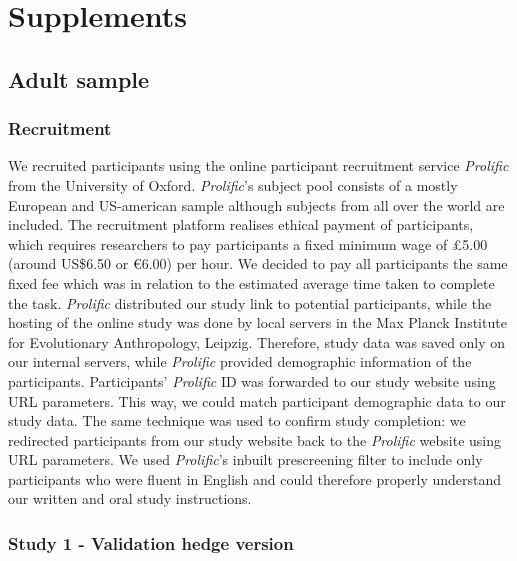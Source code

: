 \documentclass[
  man,floatsintext]{apa6}
\begin{document}
\endgroup

\newpage

\hypertarget{supplements}{%
\section{Supplements}\label{supplements}}

\hypertarget{adult-sample}{%
\subsection{Adult sample}\label{adult-sample}}

\hypertarget{recruitment}{%
\subsubsection{Recruitment}\label{recruitment}}

We recruited participants using the online participant recruitment service \emph{Prolific} from the University of Oxford. \emph{Prolific}'s subject pool consists of a mostly European and US-american sample although subjects from all over the world are included. The recruitment platform realises ethical payment of participants, which requires researchers to pay participants a fixed minimum wage of £5.00 (around US\$6.50 or €6.00) per hour. We decided to pay all participants the same fixed fee which was in relation to the estimated average time taken to complete the task.
\emph{Prolific} distributed our study link to potential participants, while the hosting of the online study was done by local servers in the Max Planck Institute for Evolutionary Anthropology, Leipzig. Therefore, study data was saved only on our internal servers, while \emph{Prolific} provided demographic information of the participants.
Participants' \emph{Prolific} ID was forwarded to our study website using URL parameters. This way, we could match participant demographic data to our study data. The same technique was used to confirm study completion: we redirected participants from our study website back to the \emph{Prolific} website using URL parameters.
We used \emph{Prolific}'s inbuilt prescreening filter to include only participants who were fluent in English and could therefore properly understand our written and oral study instructions.

\hypertarget{study-1---validation-hedge-version}{%
\subsubsection{Study 1 - Validation hedge version}\label{study-1---validation-hedge-version}}
\end{document}
